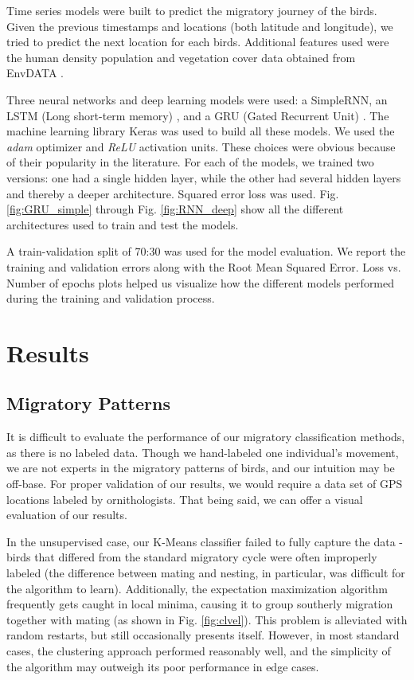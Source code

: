 \documentclass[letterpaper, 10pt, conference]{ieeeconf}  %
\begin{document}
	Time series models were built to predict the migratory journey of the birds. Given the previous timestamps and locations (both latitude and longitude), we tried to predict the next location for each birds. Additional features used were the human density population and vegetation cover data obtained from EnvDATA \cite{envdata}.

	Three neural networks and deep learning models were used: a SimpleRNN, an LSTM (Long short-term memory) \cite{lstm}, and a GRU (Gated Recurrent Unit) \cite{gru}. The machine learning library Keras \cite{keras} was used to build all these models. We used the \textit{adam} optimizer and \textit{ReLU} activation units. These choices were obvious because of their popularity in the literature. For each of the models, we trained two versions: one had a single hidden layer, while the other had several hidden layers and thereby a deeper architecture. Squared error loss was used. Fig. \ref{fig:GRU_simple} through Fig. \ref{fig:RNN_deep} show all the different architectures used to train and test the models.

	A train-validation split of 70:30 was used for the model evaluation. We report the training and validation errors along with the Root Mean Squared Error. Loss vs. Number of epochs plots helped us visualize how the different models performed during the training and validation process.

\section{Results} \label{results}
\subsection{Migratory Patterns}
	It is difficult to evaluate the performance of our migratory classification methods, as there is no labeled data. Though we hand-labeled one individual's movement, we are not experts in the migratory patterns of birds, and our intuition may be off-base. For proper validation of our results, we would require a data set of GPS locations labeled by ornithologists. That being said, we can offer a visual evaluation of our results. 
    
    In the unsupervised case, our K-Means classifier failed to fully capture the data - birds that differed from the standard migratory cycle were often improperly labeled (the difference between mating and nesting, in particular, was difficult for the algorithm to learn). Additionally, the expectation maximization algorithm frequently gets caught in local minima, causing it to group southerly migration together with mating (as shown in Fig. \ref{fig:clvel}). This problem is alleviated with random restarts, but still occasionally presents itself. However, in most standard cases, the clustering approach performed reasonably well, and the simplicity of the algorithm may outweigh its poor performance in edge cases.
    
\end{document}
